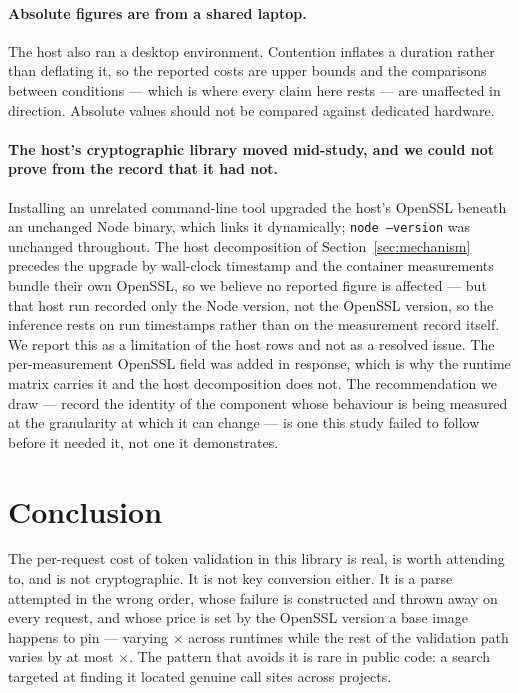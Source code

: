 \documentclass[pdflatex,sn-basic,twocolumn]{sn-jnl}
\begin{document}
\paragraph{Absolute figures are from a shared laptop.} The host also ran a
desktop environment. Contention inflates a duration rather than deflating it, so
the reported costs are upper bounds and the comparisons between conditions ---
which is where every claim here rests --- are unaffected in direction. Absolute
values should not be compared against dedicated hardware.

\paragraph{The host's cryptographic library moved mid-study, and we could not
prove from the record that it had not.} Installing an unrelated command-line tool
upgraded the host's OpenSSL beneath an unchanged Node binary, which links it
dynamically; \texttt{node --version} was unchanged throughout. The host
decomposition of Section~\ref{sec:mechanism} precedes the upgrade by wall-clock
timestamp and the container measurements bundle their own OpenSSL, so we believe
no reported figure is affected --- but that host run recorded only the Node
version, not the OpenSSL version, so the inference rests on run timestamps rather
than on the measurement record itself. We report this as a limitation of the
host rows and not as a resolved issue. The per-measurement OpenSSL field was
added in response, which is why the runtime matrix carries it and the host
decomposition does not. The recommendation we draw --- record the identity of
the component whose behaviour is being measured at the granularity at which it
can change --- is one this study failed to follow before it needed it, not one
it demonstrates.

\section{Conclusion}\label{sec:conclusion}

The per-request cost of token validation in this library is real, is worth
attending to, and is not cryptographic. It is not key conversion either. It is a
parse attempted in the wrong order, whose failure is constructed and thrown away
on every request, and whose price is set by the OpenSSL version a base image
happens to pin --- varying \SpanProbeThrows$\times$ across runtimes while the rest
of the validation path varies by at most \SpanJwtPreparsed$\times$. The pattern
that avoids it is rare in public code: a search targeted at finding it located
\AdjudicatedGenuine{} genuine call sites across \AdjudicatedGenuineProjects{}
projects.
\end{document}
